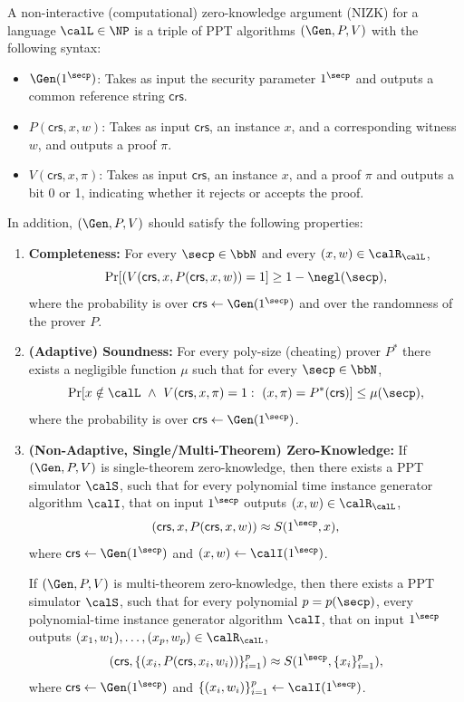 \documentclass{article}
\newcommand{\crs}{\mathsf{crs}}
\begin{document}
\begin{definition}
    A non-interactive (computational) zero-knowledge argument (NIZK) for a language $\calL \in \NP$ is a triple of PPT algorithms $(\Gen, P, V)$ with the following syntax:
    \begin{itemize}
        \item $\Gen(1^{\secp})$: Takes as input the security parameter $1^{\secp}$ and outputs a common reference string $\crs$.
        \item $P(\crs, x, w)$: Takes as input $\crs$, an instance $x$, and a corresponding witness $w$, and outputs a proof $\pi$.
        \item $V(\crs, x, \pi)$: Takes as input $\crs$, an instance $x$, and a proof $\pi$ and outputs a bit 0 or 1, indicating whether it rejects or accepts the proof.
    \end{itemize}
    In addition, $(\Gen, P, V)$ should satisfy the following properties:
    \begin{enumerate}
        \item \textbf{Completeness:} For every $\secp \in \bbN$ and every $(x, w) \in \calR_{\calL}$, 
            \[ \Pr[(V(\crs, x, P(\crs, x, w)) = 1] \geq 1-\negl(\secp), \]
        where the probability is over $\crs \gets \Gen(1^{\secp})$ and over the randomness of the prover $P$. 
        \item \textbf{(Adaptive) Soundness:} For every poly-size (cheating) prover $P^{*}$ there exists a negligible function $\mu$ such that for every $\secp \in \bbN$,
            \[ \Pr[x \notin \calL~ \land~ V(\crs, x, \pi) = 1:~ (x, \pi) = P^{*}(\crs)] \leq \mu(\secp), \]
        where the probability is over $\crs \gets \Gen(1^{\secp})$.
        \item \textbf{(Non-Adaptive, Single/Multi-Theorem) Zero-Knowledge:} If $(\Gen, P, V)$ is single-theorem zero-knowledge, then there exists a PPT simulator $\calS$, such that for every polynomial time instance generator algorithm $\calI$, that on input $1^{\secp}$ outputs $(x, w) \in \calR_{\calL}$,
            \[ (\crs, x, P(\crs, x, w)) \approx S(1^{\secp}, x), \]
        where $\crs \gets \Gen(1^{\secp})$ and $(x, w) \gets \calI(1^{\secp})$.

        If $(\Gen, P, V)$ is multi-theorem zero-knowledge, then there exists a PPT simulator $\calS$, such that for every polynomial $p = p(\secp)$, every polynomial-time instance generator algorithm $\calI$, that on input $1^{\secp}$ outputs $(x_1, w_1), \ldots, (x_p, w_p) \in \calR_{\calL}$,
            \[ (\crs, \{(x_i, P(\crs, x_i, w_i))\}_{i = 1}^p) \approx S(1^{\secp}, \{x_i\}_{i = 1}^p), \]
        where $\crs \gets \Gen(1^{\secp})$ and $\{(x_i, w_i)\}_{i = 1}^p \gets \calI(1^{\secp})$.
    \end{enumerate}
\end{definition}
\end{document}
